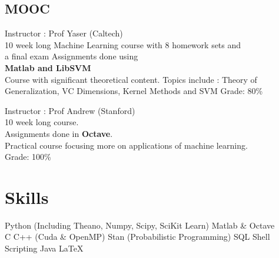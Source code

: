 \documentclass[]{deedy-resume}
\begin{document}
\begin{minipage}[t]{0.33\textwidth}
\subsection{MOOC}
\textbullet{} Instructor : Prof Yaser (Caltech)\\
\textbullet{} 10 week long Machine Learning course with 8 homework sets and \\a final exam
\textbullet{} Assignments done using \\ \textbf{Matlab and LibSVM}\\
\textbullet{} Course with significant theoretical content. Topics include : Theory of Generalization, VC Dimensions, Kernel Methods and SVM
\textbullet{} Grade: 80\%

\sectionsep
{}
\textbullet{} Instructor : Prof Andrew (Stanford)\\
\textbullet{} 10 week long course.\\
\textbullet{} Assignments done in \textbf{Octave}.\\
\textbullet{} Practical course focusing more on applications of machine learning.\\
\textbullet{} Grade: 100\%



\section{Skills}
\textbullet{} Python (Including Theano, Numpy, Scipy, SciKit Learn) \textbullet{} Matlab \& Octave  \\
\sectionsep
{}
\textbullet{} C \textbullet{} C++ (Cuda \& OpenMP) \textbullet{} Stan (Probabilistic Programming) \textbullet{} SQL \textbullet{} Shell Scripting \textbullet{} Java \textbullet{} \LaTeX \\

%
%

\end{minipage} 
\hfill
\end{document}
